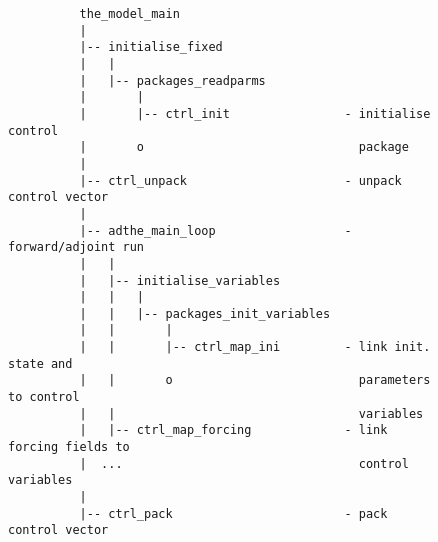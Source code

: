 \begin{figure}[!ht]

{\scriptsize
\begin{verbatim}
          the_model_main
          |
          |-- initialise_fixed
          |   |
          |   |-- packages_readparms
          |       |
          |       |-- ctrl_init                - initialise control
          |       o                              package
          |
          |-- ctrl_unpack                      - unpack control vector
          |
          |-- adthe_main_loop                  - forward/adjoint run
          |   |
          |   |-- initialise_variables
          |   |   |
          |   |   |-- packages_init_variables
          |   |       |
          |   |       |-- ctrl_map_ini         - link init. state and
          |   |       o                          parameters to control 
          |   |                                  variables
          |   |-- ctrl_map_forcing             - link forcing fields to
          |  ...                                 control variables
          |
          |-- ctrl_pack                        - pack control vector
\end{verbatim}
}
\caption{~}
\label{fig:ctrlflow}
\end{figure}
